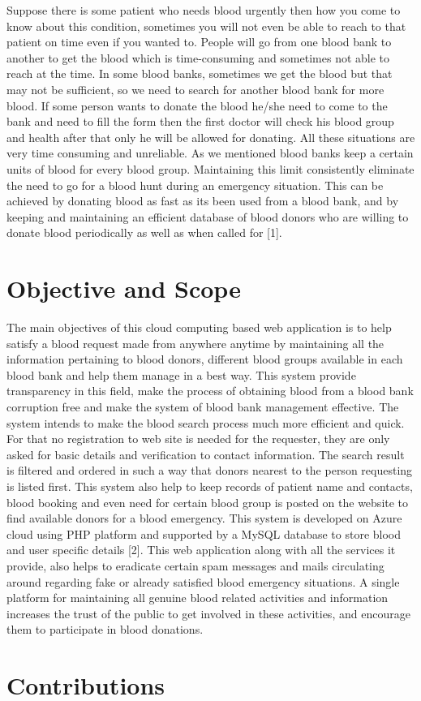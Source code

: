 \noindent Suppose there is some patient who needs blood urgently then how you come to know about this condition, sometimes you will not even be able to reach to that patient on time even if you wanted to. People will go from one blood bank to another to get the blood which is time-consuming and sometimes not able to reach at the time. In some blood banks, sometimes we get the blood but that may not be sufficient, so we need to search for another blood bank for more blood. If some person wants to donate the blood he/she need to come to the bank and need to fill the form then the first doctor will check his blood group and health after that only he will be allowed for donating. All these situations are very time consuming and unreliable. As we mentioned blood banks keep a certain units of blood for every blood group. Maintaining this limit consistently eliminate the need to go for a blood hunt during an emergency situation. This can be achieved by donating blood as fast as its been used from a blood bank, and by keeping and maintaining an efficient database of blood donors who are willing to donate blood periodically as well as when called for [1].


\section{Objective and Scope}

The main objectives of this cloud computing based web application is to help satisfy a blood request made from anywhere anytime by maintaining all the information pertaining to blood donors, different blood groups available in each blood bank and help them manage in a best way. This system provide transparency in this field, make the process of obtaining blood from a blood bank corruption free and make the system of blood bank management effective. The system intends to make the blood search process much more efficient and quick. For that no registration to web site is needed for the requester, they are only asked for basic details and verification to contact information. The search result is filtered and ordered in such a way that donors nearest to the person requesting is listed first. This system also help to keep records of patient name and contacts, blood booking and even need for certain blood group is posted on the website to find available donors for a blood emergency. This system is developed on Azure cloud using PHP platform and supported by a MySQL database to store blood and user specific details [2]. This web application along with all the services it provide, also helps to eradicate certain spam messages and mails circulating around regarding fake or already satisfied blood emergency situations. A single platform for maintaining all genuine blood related activities and information increases the trust of the public to get involved in these activities, and encourage them to participate in blood donations. 

\section{Contributions}








